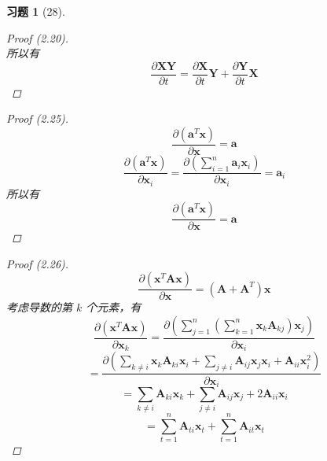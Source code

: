 \documentclass[a4paper, UTF8]{ctexart}
\newtheorem*{exercise}{\textbf{习题}}
\begin{document}
\begin{exercise}[28]
\begin{proof}[Proof (2.20)]
\begin{equation*}
		\end{equation*}
		所以有
		\begin{equation*}
			\frac{\partial\mathbf{XY}}{\partial t} = \frac{\partial \mathbf{X}}{\partial t} \mathbf{Y} + \frac{\partial \mathbf{Y}}{\partial t} \mathbf{X}
		\end{equation*}
	\end{proof}
	\begin{proof}[Proof (2.25)]
		\begin{equation*}
			\frac{\partial \left(\mathbf{a}^T\mathbf{x}\right)}{\partial \mathbf{x}} = \mathbf{a}
		\end{equation*}
		\begin{equation*}
			\frac{\partial \left( \mathbf{a}^T \mathbf{x} \right)}{\partial \mathbf{x}_i}= \frac{\partial \left( \sum_{i=1}^n \mathbf{a}_i \mathbf{x}_i \right)}{\partial \mathbf{x}_i} = \mathbf{a}_i
		\end{equation*}
		所以有
		\begin{equation*}
			\frac{\partial \left( \mathbf{a}^T \mathbf{x} \right)}{\partial \mathbf{x}} = \mathbf{a}
		\end{equation*}
	\end{proof}
	\begin{proof}[Proof (2.26)]
		\begin{equation*}
			\frac{\partial \left(\mathbf{x}^T \mathbf{A} \mathbf{x}\right)}{\partial \mathbf{x}} = \left( \mathbf{A} + \mathbf{A}^T \right) \mathbf{x}
		\end{equation*}
		考虑导数的第 $k$ 个元素，有
		\begin{equation*}
			\frac{\partial \left( \mathbf{x}^T \mathbf{A}\mathbf{x} \right)}{\partial \mathbf{x}_k} = \frac{\partial \left( \sum_{j=1}^n \left( \sum_{k=1}^n \mathbf{x}_k \mathbf{A}_{kj} \right) \mathbf{x}_j \right)}{\partial \mathbf{x}_i}
		\end{equation*}
		\begin{equation*}
			= \frac{\partial \left( \sum_{k\neq i} \mathbf{x}_k \mathbf{A}_{ki} \mathbf{x}_i + \sum_{j \neq i} \mathbf{A}_{ij} \mathbf{x}_j \mathbf{x}_i + \mathbf{A}_{ii}\mathbf{x}_i^2 \right)}{\partial \mathbf{x}_i}
		\end{equation*}
		\begin{equation*}
			= \sum_{k\neq i}\mathbf{A}_{ki} \mathbf{x}_k + \sum_{j\neq i}\mathbf{A}_{ij} \mathbf{x}_j + 2 \mathbf{A}_{ii} \mathbf{x}_i
		\end{equation*}
		\begin{equation*}
			=\sum_{t=1}^n \mathbf{A}_{ti} \mathbf{x}_t + \sum_{t=1}^n \mathbf{A}_{it} \mathbf{x}_t

\end{equation*}
\end{proof}
\end{exercise}
\end{document}
